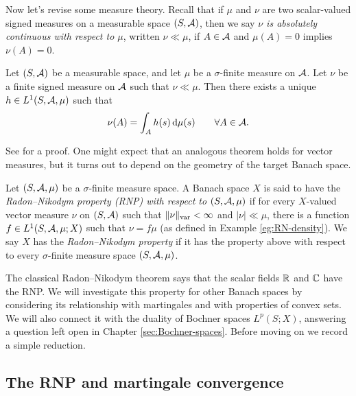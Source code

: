 Now let's revise some measure theory.
Recall that if $\mu$ and $\nu$ are two scalar-valued signed measures on a measurable space $(S,\mathcal{A})$, then we say \emph{$\nu$ is absolutely continuous with respect to $\mu$}, written $\nu \ll \mu$, if $A \in \mathcal{A}$ and $\mu(A) = 0$ implies $\nu(A) = 0$.

\begin{thm}
  Let $(S,\mathcal{A})$ be a measurable space, and let $\mu$ be a $\sigma$-finite measure on $\mathcal{A}$.
  Let $\nu$ be a finite signed measure on $\mathcal{A}$ such that $\nu \ll \mu$.
  Then there exists a unique $h \in L^1(S,\mathcal{A},\mu)$ such that
  \begin{equation*}
    \nu(A) = \int_{A} h(s) \, \mathrm{d}\mu(s) \qquad \forall A \in \mathcal{A}.
  \end{equation*}
\end{thm}

See \cite[Theorem 5.5.4]{rD04} for a proof.
One might expect that an analogous theorem holds for vector measures, but it turns out to depend on the geometry of the target Banach space.

\begin{defn}
  Let $(S,\mathcal{A},\mu)$ be a $\sigma$-finite measure space.
  A Banach space $X$ is said to have the \emph{Radon--Nikodym property (RNP) with respect to $(S,\mathcal{A},\mu)$} if for every $X$-valued vector measure $\nu$ on $(S,\mathcal{A})$ such that $\|\nu\|_{\mathrm{var}} < \infty$ and $|\nu| \ll \mu$, there is a function $f \in L^1(S,\mathcal{A},\mu;X)$ such that $\nu = f\mu$ (as defined in Example \ref{eg:RN-density}).
  We say $X$ has the \emph{Radon--Nikodym property} if it has the property above with respect to every $\sigma$-finite measure space $(S,\mathcal{A},\mu)$.
\end{defn}

The classical Radon--Nikodym theorem says that the scalar fields $\mathbb{R}$ and $\mathbb{C}$ have the RNP.
We will investigate this property for other Banach spaces by considering its relationship with martingales and with properties of convex sets.
We will also connect it with the duality of Bochner spaces $L^p(S;X)$, answering a question left open in Chapter \ref{sec:Bochner-spaces}.
Before moving on we record a simple reduction.

\begin{prop}\label{prop:RNP-finite-sufficient}
\end{prop}

\subsection{The RNP and martingale convergence}

